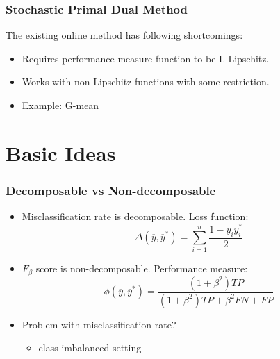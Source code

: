 \documentclass{beamer}
\begin{document}
\begin{frame}
	\frametitle{Stochastic Primal Dual Method \cite{p3}}
	The existing online method has following shortcomings:
	\begin{itemize}
		\item Requires performance measure function to be L-Lipschitz.
		\item Works with non-Lipschitz functions with some restriction.
		\item Example: G-mean
	\end{itemize}
\end{frame}

\section{Basic Ideas} %


\begin{frame}
	\frametitle{Decomposable vs Non-decomposable}
	\begin{itemize}
		\item Misclassification rate is decomposable. Loss function:
		\begin{equation*}
		\Delta(\overline{y},\overline{y}^*) = \sum_{i=1}^{n} \frac{1-y_iy_i^*}{2}
		\end{equation*}
		\item $F_\beta$ score is non-decomposable. Performance measure:
		\begin{equation*}
		\phi(\overline{y},\overline{y}^*) = \frac{(1+\beta^2)TP}{(1+\beta^2)TP+\beta^2FN+FP}
		\end{equation*}
		\item Problem with misclassification rate?
		\begin{itemize}
			\item class imbalanced setting
		\end{itemize}
	\end{itemize}	
\end{frame}

\end{document}
